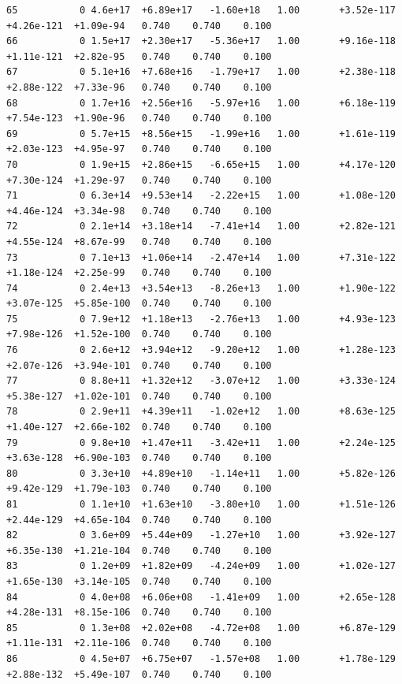 \documentclass[12pt]{article}
\numberwithin{equation}{section}
\begin{document}
\begin{lstlisting}
65           0 4.6e+17  +6.89e+17   -1.60e+18   1.00       +3.52e-117  +4.26e-121  +1.09e-94   0.740    0.740    0.100
66           0 1.5e+17  +2.30e+17   -5.36e+17   1.00       +9.16e-118  +1.11e-121  +2.82e-95   0.740    0.740    0.100
67           0 5.1e+16  +7.68e+16   -1.79e+17   1.00       +2.38e-118  +2.88e-122  +7.33e-96   0.740    0.740    0.100
68           0 1.7e+16  +2.56e+16   -5.97e+16   1.00       +6.18e-119  +7.54e-123  +1.90e-96   0.740    0.740    0.100
69           0 5.7e+15  +8.56e+15   -1.99e+16   1.00       +1.61e-119  +2.03e-123  +4.95e-97   0.740    0.740    0.100
70           0 1.9e+15  +2.86e+15   -6.65e+15   1.00       +4.17e-120  +7.30e-124  +1.29e-97   0.740    0.740    0.100
71           0 6.3e+14  +9.53e+14   -2.22e+15   1.00       +1.08e-120  +4.46e-124  +3.34e-98   0.740    0.740    0.100
72           0 2.1e+14  +3.18e+14   -7.41e+14   1.00       +2.82e-121  +4.55e-124  +8.67e-99   0.740    0.740    0.100
73           0 7.1e+13  +1.06e+14   -2.47e+14   1.00       +7.31e-122  +1.18e-124  +2.25e-99   0.740    0.740    0.100
74           0 2.4e+13  +3.54e+13   -8.26e+13   1.00       +1.90e-122  +3.07e-125  +5.85e-100  0.740    0.740    0.100
75           0 7.9e+12  +1.18e+13   -2.76e+13   1.00       +4.93e-123  +7.98e-126  +1.52e-100  0.740    0.740    0.100
76           0 2.6e+12  +3.94e+12   -9.20e+12   1.00       +1.28e-123  +2.07e-126  +3.94e-101  0.740    0.740    0.100
77           0 8.8e+11  +1.32e+12   -3.07e+12   1.00       +3.33e-124  +5.38e-127  +1.02e-101  0.740    0.740    0.100
78           0 2.9e+11  +4.39e+11   -1.02e+12   1.00       +8.63e-125  +1.40e-127  +2.66e-102  0.740    0.740    0.100
79           0 9.8e+10  +1.47e+11   -3.42e+11   1.00       +2.24e-125  +3.63e-128  +6.90e-103  0.740    0.740    0.100
80           0 3.3e+10  +4.89e+10   -1.14e+11   1.00       +5.82e-126  +9.42e-129  +1.79e-103  0.740    0.740    0.100
81           0 1.1e+10  +1.63e+10   -3.80e+10   1.00       +1.51e-126  +2.44e-129  +4.65e-104  0.740    0.740    0.100
82           0 3.6e+09  +5.44e+09   -1.27e+10   1.00       +3.92e-127  +6.35e-130  +1.21e-104  0.740    0.740    0.100
83           0 1.2e+09  +1.82e+09   -4.24e+09   1.00       +1.02e-127  +1.65e-130  +3.14e-105  0.740    0.740    0.100
84           0 4.0e+08  +6.06e+08   -1.41e+09   1.00       +2.65e-128  +4.28e-131  +8.15e-106  0.740    0.740    0.100
85           0 1.3e+08  +2.02e+08   -4.72e+08   1.00       +6.87e-129  +1.11e-131  +2.11e-106  0.740    0.740    0.100
86           0 4.5e+07  +6.75e+07   -1.57e+08   1.00       +1.78e-129  +2.88e-132  +5.49e-107  0.740    0.740    0.100

\end{lstlisting}
\end{document}
